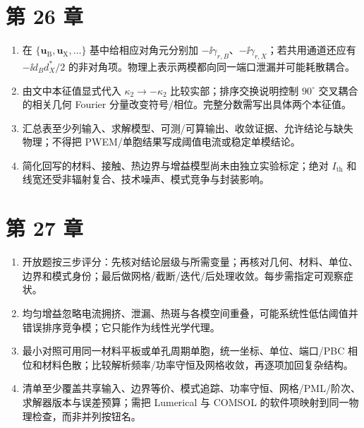 \section{第 26 章}
\begin{enumerate}
  \item 在 $\{\bm u_{\mathrm B},\bm u_{\mathrm X},\ldots\}$ 基中给相应对角元分别加 $-\ii\gamma_{r,B}$、$-\ii\gamma_{r,X}$；若共用通道还应有 $-\ii d_Bd_X^*/2$ 的非对角项。物理上表示两模都向同一端口泄漏并可能耗散耦合。
  \item 由文中本征值显式代入 $\kappa_2\to-\kappa_2$ 比较实部；排序交换说明控制 $90^\circ$ 交叉耦合的相关几何 Fourier 分量改变符号/相位。完整分数需写出具体两个本征值。
  \item 汇总表至少列输入、求解模型、可测/可算输出、收敛证据、允许结论与缺失物理；不得把 PWEM/单胞结果写成阈值电流或稳定单模结论。
  \item 简化回写的材料、接触、热边界与增益模型尚未由独立实验标定；绝对 $I_{\mathrm{th}}$ 和线宽还受非辐射复合、技术噪声、模式竞争与封装影响。
\end{enumerate}

\section{第 27 章}
\begin{enumerate}
  \item 开放题按三步评分：先核对结论层级与所需变量；再核对几何、材料、单位、边界和模式身份；最后做网格/截断/迭代/后处理收敛。每步需指定可观察症状。
  \item 均匀增益忽略电流拥挤、泄漏、热斑与各模空间重叠，可能系统性低估阈值并错误排序竞争模；它只能作为线性光学代理。
  \item 最小对照可用同一材料平板或单孔周期单胞，统一坐标、单位、端口/PBC 相位和材料色散；比较解析频率/功率守恒及网格收敛，再逐项加回复杂结构。
  \item 清单至少覆盖共享输入、边界等价、模式追踪、功率守恒、网格/PML/阶次、求解器版本与误差预算；需把 Lumerical 与 COMSOL 的软件项映射到同一物理检查，而非并列按钮名。
\end{enumerate}
